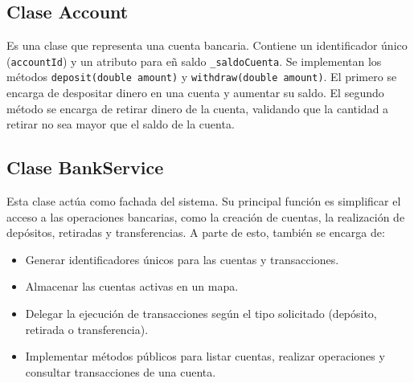 \documentclass[12pt]{article}
\begin{document}
\subsection*{Clase Account}

Es una clase que representa una cuenta bancaria. Contiene un identificador único (\texttt{accountId}) y un atributo para eñ saldo \texttt{\_saldoCuenta}. Se implementan los métodos \texttt{deposit(double amount)} y \texttt{withdraw(double amount)}. El primero se encarga de despositar dinero en una cuenta y aumentar su saldo. El segundo método se encarga de retirar dinero de la cuenta, validando que la cantidad a retirar no sea mayor que el saldo de la cuenta.


\subsection*{Clase BankService}
Esta clase actúa como fachada del sistema. Su principal función es simplificar el acceso a las operaciones bancarias, como la creación de cuentas, la realización de depósitos, retiradas y transferencias. A parte de esto, también se encarga de:
\begin{itemize}
    \item Generar identificadores únicos para las cuentas y transacciones.
    \item Almacenar las cuentas activas en un mapa.
    \item Delegar la ejecución de transacciones según el tipo solicitado (depósito, retirada o transferencia).
    \item Implementar métodos públicos para listar cuentas, realizar operaciones y consultar transacciones de una cuenta.
\end{itemize}
\end{document}
